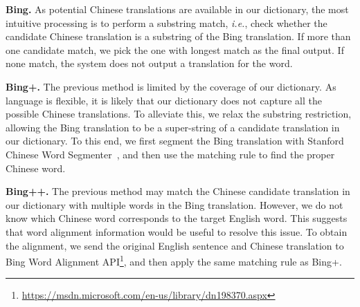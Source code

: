 \begin{CJK}{UTF8}{gbsn}
{\bf Bing.} As potential Chinese translations are available in our dictionary, the most intuitive processing is to perform a substring match, {\it i.e.}, check whether the candidate Chinese translation is a substring of the Bing translation. If more than one candidate match, we pick the one with longest match as the final output. If none match, the system does not output a translation for the word.

{\bf Bing+.} The previous method is limited by the coverage of our dictionary. As language is flexible, it is likely that our dictionary does not capture all the possible Chinese translations. To alleviate this, we relax the substring restriction, allowing the Bing translation to be a super-string of a candidate translation in our dictionary. To this end, we first segment the Bing translation with Stanford Chinese Word Segmenter~\cite{Chang2008}, and then use the matching rule to find the proper Chinese word. 


{\bf Bing++.} %
The previous method may match the Chinese candidate translation in our dictionary with multiple words in the Bing translation. However, we do not know which Chinese word corresponds to the target English word. This suggests that word alignment information would be useful to resolve this issue. To obtain the alignment, we send the original English sentence and Chinese translation to Bing Word Alignment API\footnote{\url{https://msdn.microsoft.com/en-us/library/dn198370.aspx}}, and then apply the same matching rule as Bing+.


\end{CJK}
